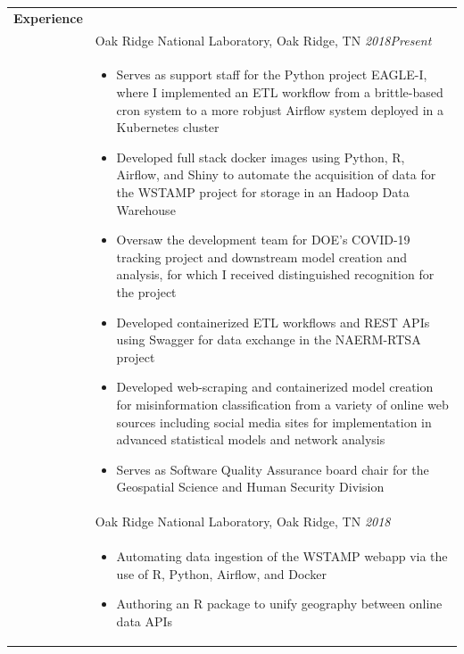 \documentclass[10pt]{article}%
\begin{document}
\begin{minipage}[ht]{.8\linewidth}%
   \bgroup%
   \def\arraystretch{.8}
   \begin{tabularx}{\linewidth}{p{1.8cm}M}%
      \midrule
      \textbf{Experience} & 
       \\
      & Oak Ridge National Laboratory, Oak Ridge, TN \textit{2018\textemdash{}Present} \\
      & \begin{itemize}[topsep=-12pt,parsep=0em]
          \setlength\itemsep{0em}
          \item Serves as support staff for the Python project EAGLE-I, where I implemented an ETL workflow from a brittle-based cron system to a more robjust Airflow system deployed in a Kubernetes cluster %
          \item Developed full stack docker images using Python, R, Airflow,  and Shiny to automate the acquisition of data for the WSTAMP project for storage in an Hadoop Data Warehouse %
          \item Oversaw the development team for DOE's COVID-19 tracking project and downstream model creation and analysis, for which I received distinguished recognition for the project %
          \item Developed containerized ETL workflows and REST APIs using Swagger for data exchange in the NAERM-RTSA project %
          \item Developed web-scraping and containerized model creation for misinformation classification from a variety of online web sources including social media sites for implementation in advanced statistical models and network analysis %
          \item Serves as Software Quality Assurance board chair for the Geospatial Science and Human Security Division %
        \end{itemize}
       \\
      & Oak Ridge National Laboratory, Oak Ridge, TN \textit{2018 } \\
      & \begin{itemize}[topsep=-12pt,parsep=0em]
          \setlength\itemsep{0em}
          \item Automating data ingestion of the WSTAMP webapp via the use of R, Python, Airflow, and Docker %
          \item Authoring an R package to unify geography between online data APIs %

\end{itemize}
\end{tabularx}
\end{minipage}
\end{document}
